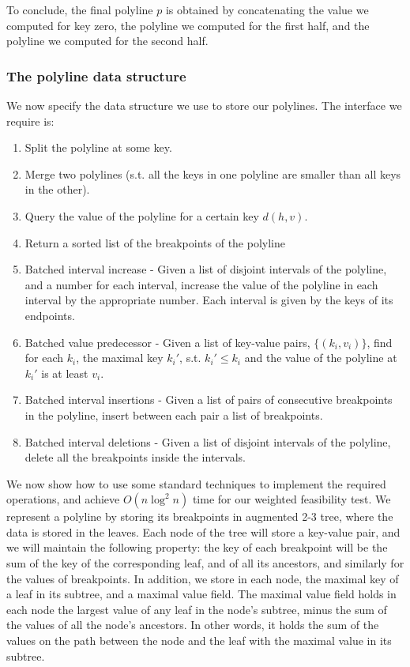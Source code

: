 \documentclass[11pt,a4paper]{article}
\theoremstyle{definition}
\theoremstyle{remark}
\begin{document}
To conclude, the final polyline $p$ is obtained by concatenating the value we computed for key zero, the polyline we computed for the first half, and the polyline we computed for the second half. 


\subsubsection{The polyline data structure} We now specify the data structure we use to store our polylines. The interface we require is:
\begin{enumerate}
\item \label{op1} Split the polyline at some key.
\item \label{op2} Merge two polylines (s.t. all the keys in one polyline are smaller than all keys in the other).
\item \label{op3} Query the value of the polyline for a certain key $d(h,v)$.
\item \label{op4}Return a sorted list of the breakpoints of the polyline
\item \label{op5} Batched interval increase - Given a list of disjoint intervals of the polyline, and a number for each interval, increase the value of the polyline in each interval by the appropriate number. Each interval is given by the keys of its endpoints.
\item \label{op6} Batched value predecessor - Given a list of key-value pairs, $\{(k_i,v_i)\}$, find for each $k_i$, the maximal key $k_{i}'$, s.t. $k_{i}' \leq k_i$ and the value of the polyline at $k_{i}'$ is at least $v_i$.
\item \label{op7} Batched interval insertions - Given a list of pairs of consecutive breakpoints in the polyline, insert between each pair a list of breakpoints.
\item \label{op8} Batched interval deletions - Given a list of disjoint intervals of the polyline, delete all the breakpoints inside the intervals.
\end{enumerate}

We now show how to use some standard techniques to implement the required operations, and achieve $O(n \log ^2 n)$ time for our weighted feasibility test. %
We represent a polyline by storing its breakpoints in augmented 2-3 tree, where the data is stored in the leaves. Each node of the tree will store a key-value pair, and we will maintain the following property: the key of each breakpoint will be the sum of the key of the corresponding leaf, and of all its ancestors, and similarly for the values of breakpoints. In addition, we store in each node, the maximal key of a leaf in its subtree, and a maximal value field. The maximal value field holds in each node the largest value of any leaf in the node's subtree, minus the sum of the values of all the node's ancestors. In other words, it holds the sum of the values on the path between the node and the leaf with the maximal value in its subtree. %
\end{document}
